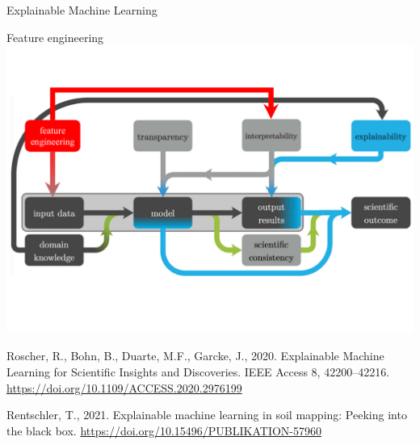 

\begin{frame}{Explainable Machine Learning}
\begin{block}{Feature engineering}
\centering\includegraphics[width=1\textwidth]{FIGURE/Explainability1.pdf} 
\end{block}

\raggedright\tiny   
\begin{inparaitem}
    \item Roscher, R., Bohn, B., Duarte, M.F., Garcke, J., 2020. Explainable Machine Learning for Scientific Insights and Discoveries. IEEE Access 8, 42200–42216. \url{https://doi.org/10.1109/ACCESS.2020.2976199       }
    \item Rentschler, T., 2021. Explainable machine learning in soil mapping: Peeking into the black box. \url{https://doi.org/10.15496/PUBLIKATION-57960        }
\end{inparaitem}
\end{frame}

